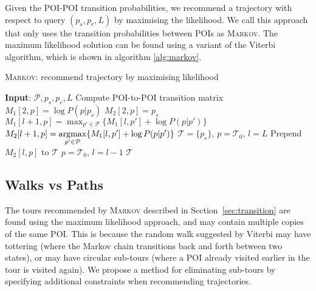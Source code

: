 Given the POI-POI transition probabilities, we recommend a trajectory with respect to query
$(p_s, p_e, L)$ by maximising the likelihood. We call this approach that only uses the
transition probabilities between POIs as \textsc{Markov}. The maximum likelihood solution
can be found using a variant of the Viterbi algorithm, which is shown in algorithm \ref{alg:markov}.


\begin{algorithm}
\caption{\textsc{Markov}: recommend trajectory by maximising likelihood}
\label{alg:markov}
\begin{algorithmic}[1]
\STATE \textbf{Input}: $\mathcal{P}, p_s, p_e, L$
\STATE Compute POI-to-POI transition matrix
    \STATE $M_1[2, p] = \log P(p|p_s)$
    \STATE $M_2[2, p] = p_s$
\ENDFOR
{}
        \STATE \(\displaystyle M_1[l+1, p] = \max_{p' \in \mathcal{P}} \{ M_1[l, p'] + \log P(p|p') \} \) 
        \STATE \(\displaystyle M_2[l+1, p] = \operatorname*{argmax}_{p' \in \mathcal{P}} \{ M_1[l, p'] + \log P(p|p') \} \)
    \ENDFOR
\ENDFOR
\STATE $\mathcal{T} = \{p_e\}$, $p = \mathcal{T}_0$, $l = L$
\REPEAT
    \STATE Prepend $M_2[l, p]$ to $\mathcal{T}$
    \STATE $p = \mathcal{T}_0$, $l = l - 1$
\RETURN $\mathcal{T}$
\end{algorithmic}
\end{algorithm}



\subsection{Walks vs Paths}
\label{sec:walkpath}

The tours recommended by \textsc{Markov} described in Section~\ref{sec:transition} are found
using the maximum likelihood approach, and may contain multiple copies of the same POI.
This is because the random walk suggested by Viterbi may have
tottering (where the Markov chain transitions back and forth between two states),
or may have circular sub-tours (where a POI already visited earlier in the tour is
visited again).
We propose a method for eliminating sub-tours by specifying additional constraints
when recommending trajectories.



